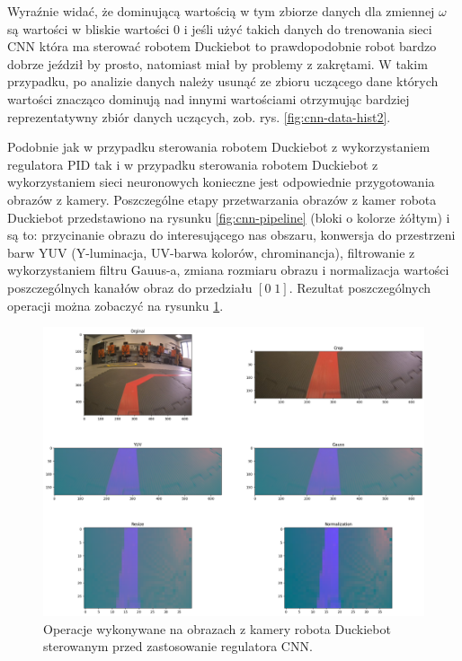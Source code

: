 \documentclass[conference]{IEEEtran}
\begin{document}
Wyraźnie widać, że dominującą wartością w tym zbiorze danych dla zmiennej $\omega$ są wartości w bliskie wartości $0$ i jeśli użyć takich danych do trenowania sieci CNN która ma sterować robotem Duckiebot to prawdopodobnie robot bardzo dobrze jeździł by prosto, natomiast miał by problemy z zakrętami. W takim przypadku, po analizie danych należy usunąć ze zbioru uczącego dane których wartości znacząco dominują nad innymi wartościami otrzymując bardziej reprezentatywny zbiór danych uczących, zob. rys. \ref{fig:cnn-data-hist2}.

Podobnie jak w przypadku sterowania robotem Duckiebot z wykorzystaniem regulatora PID tak i w przypadku sterowania robotem Duckiebot z wykorzystaniem sieci neuronowych konieczne jest odpowiednie przygotowania obrazów z kamery. Poszczególne etapy przetwarzania obrazów z kamer robota Duckiebot przedstawiono na rysunku \ref{fig:cnn-pipeline} (bloki o kolorze żółtym) i są to: przycinanie obrazu do interesującego nas obszaru, konwersja do przestrzeni barw YUV (Y-luminacja, UV-barwa kolorów, chrominancja), filtrowanie z wykorzystaniem filtru Gauus-a, zmiana rozmiaru obrazu i normalizacja wartości poszczególnych kanałów obraz do przedziału $[0\;1]$. Rezultat poszczególnych operacji można zobaczyć na rysunku \ref{fig:cnn-image-prepare}.

\begin{figure}[h]
    \centering
    \includegraphics[width=.95\columnwidth]{nn_prepare_image}
    \caption{Operacje wykonywane na obrazach z kamery robota Duckiebot sterowanym przed zastosowanie regulatora CNN.}
    \label{fig:cnn-image-prepare}
\end{figure}
\end{document}
